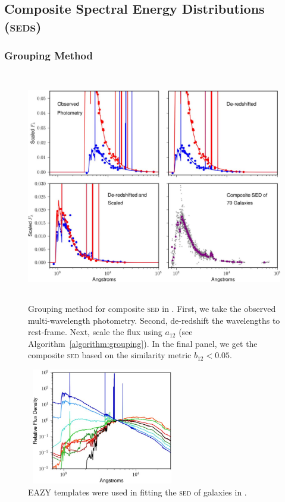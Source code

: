 \documentclass{ar-1col}
\begin{document}
\subsection{Composite Spectral Energy Distributions (\textsc{sed}s)}




\subsubsection{Grouping Method}


\begin{figure}
    \includegraphics[width=5in, height=4in]{images/grouping.png}
    \caption{Grouping method for composite \textsc{sed} in \citet{Forrest2018}. First, we take the observed multi-wavelength photometry. Second, de-redshift the wavelengths to rest-frame. Next, scale the flux using $a_{12}$ (see Algorithm~\ref{algorithm:grouping}). In the final panel, we get the composite \textsc{sed} based on the similarity metric $b_{12} < 0.05$.}
    \label{fig:grouping}
\end{figure}
 
 
\begin{figure}
    \includegraphics[width=2.6in, height=2in]{images/EAZY.png}
    \caption{EAZY \citep{Brammer2008} templates were used in fitting the \textsc{sed} of galaxies in \citet{Forrest2018}.}
    \label{fig:EAZY}
\end{figure}
\end{document}
